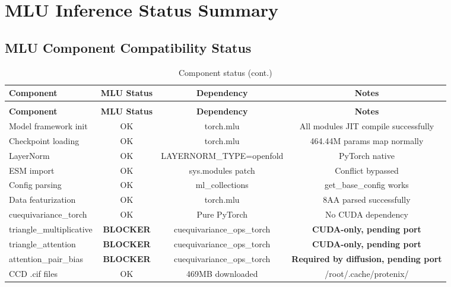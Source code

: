 \documentclass[12pt,a4paper]{article}
\begin{document}
\clearpage

\section{MLU Inference Status Summary}

\subsection{MLU Component Compatibility Status}

\begin{longtable}{lccc}
    \caption{Protenix-v2 Component MLU Compatibility Status} \\
    \toprule
    \textbf{Component} & \textbf{MLU Status} & \textbf{Dependency} & \textbf{Notes} \\
    \midrule
    \endfirsthead
    \caption[]{Component status (cont.)} \\
    \toprule
    \textbf{Component} & \textbf{MLU Status} & \textbf{Dependency} & \textbf{Notes} \\
    \midrule
    \endhead
    \bottomrule
    \endfoot
    \endlastfoot

    Model framework init & OK & torch.mlu & All modules JIT compile successfully \\
    Checkpoint loading & OK & torch.mlu & 464.44M params map normally \\
    LayerNorm & OK & LAYERNORM_TYPE=openfold & PyTorch native \\
    ESM import & OK & sys.modules patch & Conflict bypassed \\
    Config parsing & OK & ml_collections & get_base_config works \\
    Data featurization & OK & torch.mlu & 8AA parsed successfully \\
    cuequivariance\_torch & OK & Pure PyTorch & No CUDA dependency \\
    triangle\_multiplicative & \textbf{BLOCKER} & cuequivariance\_ops\_torch & \textbf{CUDA-only, pending port} \\
    triangle\_attention & \textbf{BLOCKER} & cuequivariance\_ops\_torch & \textbf{CUDA-only, pending port} \\
    attention\_pair\_bias & \textbf{BLOCKER} & cuequivariance\_ops\_torch & \textbf{Required by diffusion, pending port} \\
    CCD .cif files & OK & 469MB downloaded & /root/.cache/protenix/ \\
\end{longtable}
\end{document}
